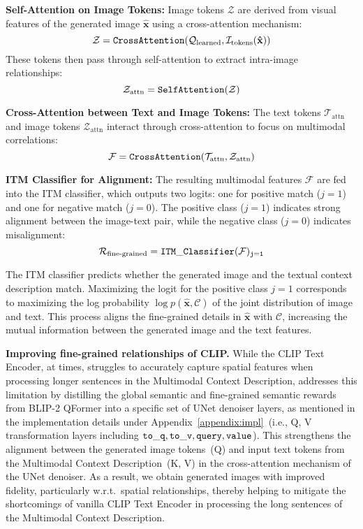 \textbf{Self-Attention on Image Tokens:}
    Image tokens $\mathcal{Z}$ are derived from visual features of the generated image $\mathbf{\hat{x}}$ using a cross-attention mechanism:
    \begin{equation}
        \mathcal{Z} = \tt{CrossAttention}(\mathcal{Q}_{\mathrm{learned}}, \mathcal{I}_{\mathrm{tokens}}(\mathbf{\hat{x}}))
    \end{equation}
    These tokens then pass through self-attention to extract intra-image relationships:
    \begin{equation}
        \mathcal{Z}_{\mathrm{attn}} = \tt{SelfAttention}(\mathcal{Z})
    \end{equation}

\textbf{Cross-Attention between Text and Image Tokens:}
    The text tokens $\mathcal{T}_{\mathrm{attn}}$ and image tokens $\mathcal{Z}_{\mathrm{attn}}$ interact through cross-attention to focus on multimodal correlations:
    \begin{equation}
        \mathcal{F} = \tt{CrossAttention}(\mathcal{T}_{\mathrm{attn}}, \mathcal{Z}_{\mathrm{attn}})
    \end{equation}

\textbf{ITM Classifier for Alignment:}
    The resulting multimodal features $\mathcal{F}$ are fed into the ITM classifier, which outputs two logits: one for positive match ($j=1$) and one for negative match ($j=0$). The positive class ($j=1$) indicates strong alignment between the image-text pair, while the negative class ($j=0$) indicates misalignment:
    \begin{equation}
        \mathcal{R}_{\textrm{fine-grained}} = \tt{ITM\_Classifier}(\mathcal{F})_{j=1}
    \end{equation}

The ITM classifier predicts whether the generated image and the textual context description match. Maximizing the logit for the positive class $j=1$ corresponds to maximizing the log probability $\log p(\mathbf{\hat{x}}, \mathcal{C})$ of the joint distribution of image and text. This process aligns the fine-grained details in $\mathbf{\hat{x}}$ with $\mathcal{C}$, increasing the mutual information between the generated image and the text features.

\textbf{Improving fine-grained relationships of CLIP.} While the CLIP Text Encoder, at times, struggles to accurately capture spatial features when processing longer sentences in the Multimodal Context Description, \method addresses this limitation by distilling the global semantic and fine-grained semantic rewards from BLIP-2 QFormer into a specific set of UNet denoiser layers, as mentioned in the implementation details under Appendix~\ref{appendix:impl}~(i.e., Q, V transformation layers including $\tt{to\_q, to\_v, query, value}$). This strengthens the alignment between the generated image tokens~(Q) and input text tokens from the Multimodal Context Description~(K, V) in the cross-attention mechanism of the UNet denoiser. As a result, we obtain generated images with improved fidelity, particularly w.r.t.~spatial relationships, thereby helping to mitigate the shortcomings of vanilla CLIP Text Encoder in processing the long sentences of the Multimodal Context Description.

